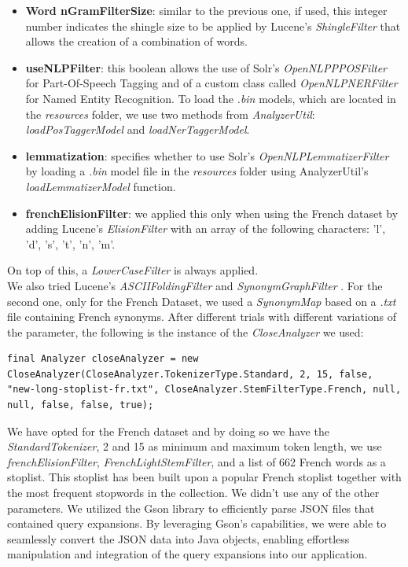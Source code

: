 \begin{itemize}
  \item \textbf{Word nGramFilterSize}: similar to the previous one, if used, this integer number indicates the shingle size to be applied by Lucene's \textit{ShingleFilter} \cite{luceneshinglefilter} that allows the creation of a combination of words.
  
  \item \textbf{useNLPFilter}: this boolean allows the use of Solr's \cite{solr} \textit{OpenNLPPPOSFilter} \cite{solropennlpposfilter} for Part-Of-Speech Tagging and of a custom class called \textit{OpenNLPNERFilter} for Named Entity Recognition. 
  To load the \textit{.bin} models, which are located in the \textit{resources} folder, we use two methods from \textit{AnalyzerUtil}: \textit{loadPosTaggerModel} and \textit{loadNerTaggerModel}.
  
  \item \textbf{lemmatization}: specifies whether to use Solr's \textit{OpenNLPLemmatizerFilter} \cite{solropennlplemmafilter} by loading a \textit{.bin} model file in the \textit{resources} folder using AnalyzerUtil's \textit{loadLemmatizerModel} function.
  
  \item \textbf{frenchElisionFilter}: we applied this only when using the French dataset by adding Lucene's \textit{ElisionFilter} \cite{luceneelisionfilter} with an array of the following characters: 'l', 'd', 's', 't', 'n', 'm'.
\end{itemize}
On top of this, a \textit{LowerCaseFilter} \cite{lucenelowercasefilter} is always applied. \\
We also tried Lucene's \textit{ASCIIFoldingFilter} \cite{luceneasciifoldingfilter} and \textit{SynonymGraphFilter} \cite{lucenesynonymgraphfilter}. 
For the second one, only for the French Dataset, we used a \textit{SynonymMap} \cite{lucenesynonymmap} based on a \textit{.txt} file containing French synonyms.
\newline
After different trials with different variations of the parameter, the following is the instance of the \textit{CloseAnalyzer} we used:

\begin{lstlisting}
final Analyzer closeAnalyzer = new CloseAnalyzer(CloseAnalyzer.TokenizerType.Standard, 2, 15, false, "new-long-stoplist-fr.txt", CloseAnalyzer.StemFilterType.French, null, null, false, false, true);
\end{lstlisting}
We have opted for the French dataset and by doing so we have the \textit{StandardTokenizer}, 2 and 15 as minimum and maximum token length, we use \textit{frenchElisionFilter}, \textit{FrenchLightStemFilter}, and a list of 662 French words as a stoplist.
This stoplist has been built upon a popular French stoplist together with the most frequent stopwords in the collection.  
We didn't use any of the other parameters.
We utilized the Gson library to efficiently parse JSON files that contained query expansions. By leveraging Gson's capabilities, we were able to seamlessly convert the JSON data into Java objects, enabling effortless manipulation and integration of the query expansions into our application.



